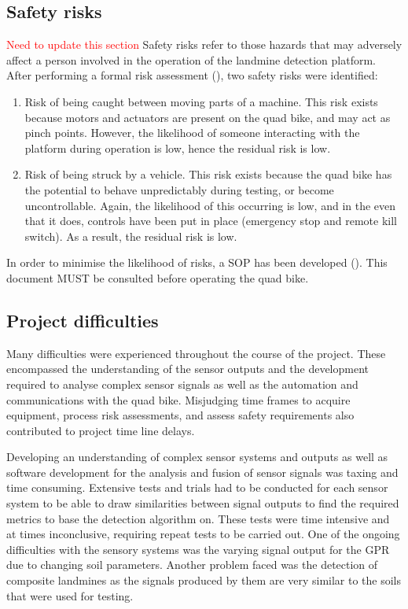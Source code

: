\documentclass[main.tex]{subfiles}
\begin{document}
\subsection{Safety risks}
\textcolor{red}{Need to update this section}
Safety risks refer to those hazards that may adversely affect a person involved in the operation of the landmine detection platform. After performing a formal risk assessment (), two safety risks were identified:
\begin{enumerate}
\item Risk of being caught between moving parts of a machine. This risk exists because motors and actuators are present on the quad bike, and may act as pinch points. However, the likelihood of someone interacting with the platform during operation is low, hence the residual risk is low.
\item Risk of being struck by a vehicle. This risk exists because the quad bike has the potential to behave unpredictably during testing, or become uncontrollable. Again, the likelihood of this occurring is low, and in the even that it does, controls have been put in place (emergency stop and remote kill switch). As a result, the residual risk is low.
\end{enumerate}
In order to minimise the likelihood of risks, a SOP has been developed (). This document MUST be consulted before operating the quad bike. 
% 

\subsection{Project difficulties}%
Many difficulties were experienced throughout the course of the project. These encompassed the understanding of the sensor outputs and the development required to analyse complex sensor signals as well as the automation and communications with the quad bike. Misjudging time frames to acquire equipment, process risk assessments, and assess safety requirements also contributed to project time line delays.

Developing an understanding of complex sensor systems and outputs as well as software development for the analysis and fusion of sensor signals was taxing and time consuming. Extensive tests and trials had to be conducted for each sensor system to be able to draw similarities between signal outputs to find the required metrics to base the detection algorithm on. These tests were time intensive and at times inconclusive, requiring repeat tests to be carried out. One of the ongoing difficulties with the sensory systems was the varying signal output for the GPR due to changing soil parameters. Another problem faced was the detection of composite landmines as the signals produced by them are very similar to the soils that were used for testing. 
\end{document}

